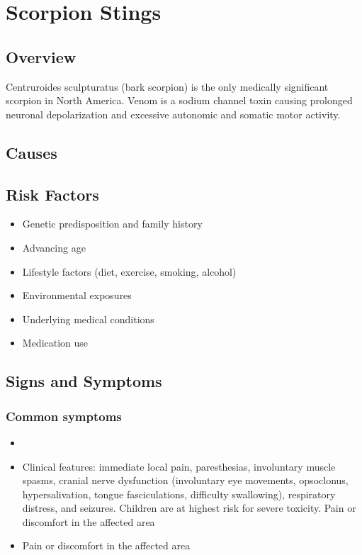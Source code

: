 \chapter{Scorpion Stings}
\label{sec:Scorpion Stings}

\section{Overview}
Centruroides sculpturatus (bark scorpion) is the only medically significant scorpion in North America. Venom is a sodium channel toxin causing prolonged neuronal depolarization and excessive autonomic and somatic motor activity.
\section{Causes}
\section{Risk Factors}

\begin{itemize}[noitemsep]
  \item Genetic predisposition and family history
  \item Advancing age
  \item Lifestyle factors (diet, exercise, smoking, alcohol)
  \item Environmental exposures
  \item Underlying medical conditions
  \item Medication use
\end{itemize}
\section{Signs and Symptoms}

\subsection{Common symptoms}
\begin{itemize}[noitemsep]
  \item \item Clinical features: immediate local pain, paresthesias, involuntary muscle spasms, cranial nerve dysfunction (involuntary eye movements, opsoclonus, hypersalivation, tongue fasciculations, difficulty swallowing), respiratory distress, and seizures. Children are at highest risk for severe toxicity. Pain or discomfort in the affected area    \item Pain or discomfort in the affected area
  \end{itemize}

